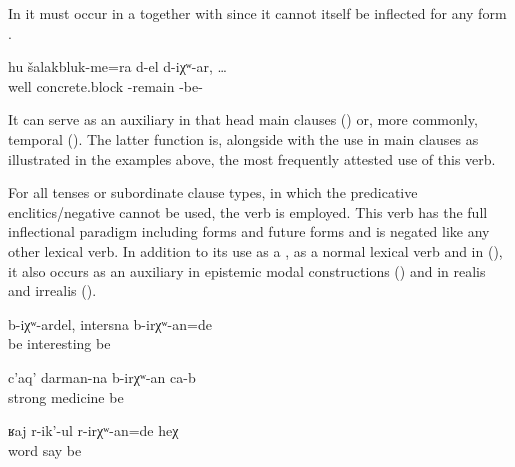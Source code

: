 In  it must occur in a  together with  since it cannot itself be inflected for any  form .
%
\begin{exe}
	\ex	\label{ex:If the concrete blocks remained (are left over)}
	\gll	hu		šalakbluk-me=ra	d-el	d-iχʷ-ar,	\ldots\\
		well		concrete.block	-remain\tsc{.pfv}	-be-\\
	\glt	{}
\end{exe}

It can serve as an auxiliary in  that head main clauses () or, more commonly, temporal  (). The latter function is, alongside with the use in main clauses as illustrated in the examples above, the most frequently attested use of this verb.

For all tenses or subordinate clause types, in which the predicative enclitics\slash negative  cannot be used, the verb   is employed. This verb has the full inflectional paradigm including  forms  and future forms  and is negated like any other lexical verb. In addition to its use as a , as a normal lexical verb and in  (), it also occurs as an auxiliary in epistemic modal constructions  () and in realis  and irrealis  ().
%
\begin{exe}
	\ex	\label{ex:If it would be like this, it would be interesting}
	\gll	b-iχʷ-ardel,	intersna	b-irχʷ-an=de\\
		be	interesting	be\\
	\glt	{}

	\ex	\label{ex:It will be a strong medicine}
	\gll	c'aq'	darman-na	b-irχʷ-an	ca-b\\
		strong	medicine be	\\
	\glt	{}

	\ex	\label{ex:She must have been quarreling}
	\gll	ʁaj	r-ik'-ul	r-irχʷ-an=de 	heχ\\
		word	say 	be 	\\
	\glt	{}
\end{exe}

